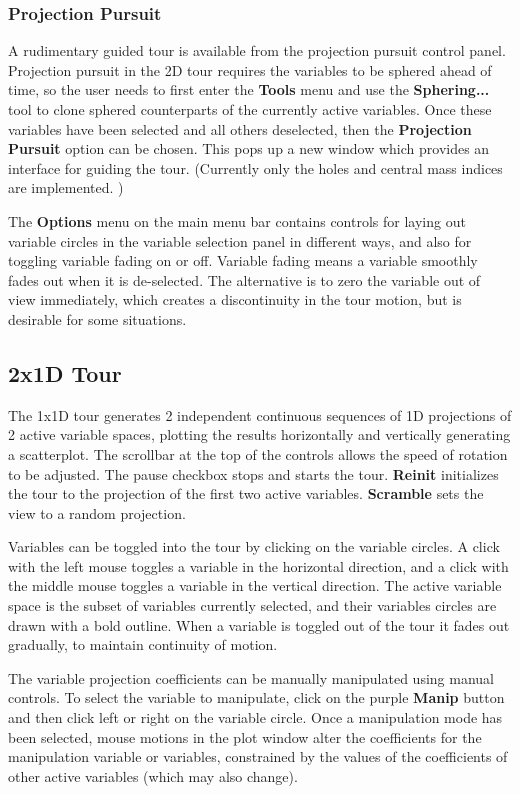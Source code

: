 \documentclass[11pt]{article}
\begin{document}
\subsubsection{Projection Pursuit}

A rudimentary guided tour is available from the projection pursuit control
panel. Projection pursuit in the 2D tour requires the variables to be
sphered ahead of time, so the user needs to first enter the {\bf Tools}
menu and use the {\bf Sphering...} tool to clone sphered counterparts of
the currently active variables. Once these variables have been selected
and all others deselected, then the {\bf Projection Pursuit} option can
be chosen. This pops up a new window which provides an interface for
guiding the tour.
(Currently only the holes and central mass indices are implemented. )


The {\bf Options} menu on the main menu bar contains controls for
laying out variable circles in the variable selection panel in
different ways, and also for toggling variable fading on or
off. Variable fading means a variable smoothly fades out when it is
de-selected. The alternative is to zero the variable out of view
immediately, which creates a discontinuity in the tour motion, but is
desirable for some situations.

\subsection{2x1D Tour}
\label{slbl:2x1DTour}

The 1x1D tour generates 2 independent continuous sequences of 1D
projections of 2 active variable spaces, plotting the results
horizontally and vertically generating a scatterplot. The scrollbar at
the top of the controls allows the speed of rotation to be
adjusted. The pause checkbox stops and starts the tour. {\bf Reinit}
initializes the tour to the projection of the first two active
variables. {\bf Scramble} sets the view to a random projection.

Variables can be toggled into the tour by clicking on the variable
circles. A click with the left mouse toggles a variable in the horizontal
direction, and a click with the middle mouse toggles a variable in
the vertical direction. The active variable space is the subset of
variables currently selected, and their variables circles are drawn with
a bold outline. When a variable is toggled out of the tour it fades out
gradually, to maintain continuity of motion.

The variable projection coefficients can be manually manipulated using
manual controls. To select the variable to manipulate, click on the purple
{\bf Manip} button and then click left or right on the variable circle.
Once a manipulation mode has been selected, mouse motions in the plot
window alter the coefficients for the manipulation variable or variables,
constrained by the values of the coefficients of other active variables
(which may also change).
\end{document}
